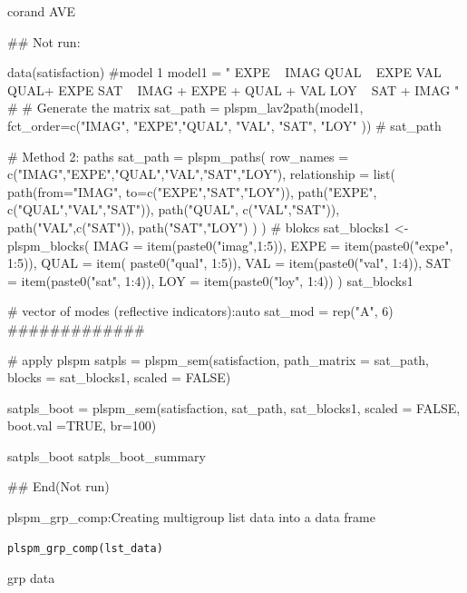 \documentclass[a4paper]{book}
\begin{document}
%
\begin{Value}
corand AVE
\end{Value}
%
\begin{Examples}
\begin{ExampleCode}

## Not run: 

data(satisfaction)
#model 1
model1 = "
EXPE ~ IMAG
QUAL ~ EXPE
VAL ~  QUAL+ EXPE
SAT ~ IMAG + EXPE + QUAL + VAL
LOY ~ SAT + IMAG
"
# # Generate the matrix
sat_path = plspm_lav2path(model1,
                          fct_order=c("IMAG", "EXPE","QUAL", "VAL", "SAT", "LOY" ))
# sat_path

# Method 2: paths
sat_path = plspm_paths(
  row_names = c("IMAG","EXPE","QUAL","VAL","SAT","LOY"),
  relationship = list(
    path(from="IMAG", to=c("EXPE","SAT","LOY")),
    path("EXPE", c("QUAL","VAL","SAT")),
    path("QUAL", c("VAL","SAT")),
    path("VAL",c("SAT")),
    path("SAT","LOY")
  )
)
# blokcs
sat_blocks1 <- plspm_blocks(
  IMAG = item(paste0("imag",1:5)),
  EXPE = item(paste0("expe", 1:5)),
  QUAL = item( paste0("qual", 1:5)),
  VAL = item(paste0("val", 1:4)),
  SAT = item(paste0("sat", 1:4)),
  LOY = item(paste0("loy", 1:4))
)
sat_blocks1

# vector of modes (reflective indicators):auto
sat_mod = rep("A", 6)
#############

# apply plspm
satpls = plspm_sem(satisfaction,
                   path_matrix = sat_path,
                   blocks = sat_blocks1,
                   scaled = FALSE)

satpls_boot = plspm_sem(satisfaction, sat_path, sat_blocks1, scaled = FALSE,
                        boot.val =TRUE, br=100)

satpls_boot %
satpls_boot_summary %


## End(Not run)
\end{ExampleCode}
\end{Examples}
%
\begin{Description}
plspm\_grp\_comp:Creating multigroup list data into a data frame
\end{Description}
%
\begin{Usage}
\begin{verbatim}
plspm_grp_comp(lst_data)
\end{verbatim}
\end{Usage}
%
\begin{Arguments}
\begin{ldescription}
\item[\code{lst\_data}] grp data
\end{ldescription}
\end{Arguments}
\end{document}

